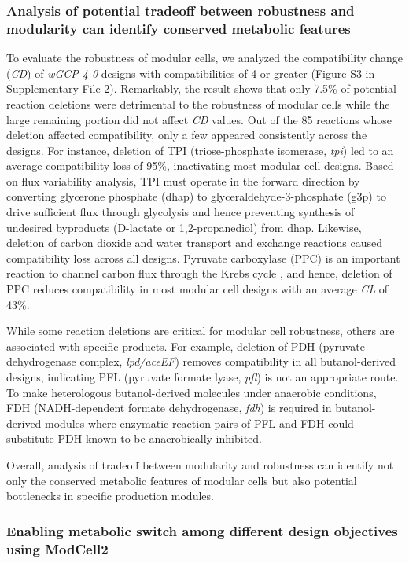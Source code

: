 \subsubsection{Analysis of potential tradeoff between robustness and
modularity can identify conserved metabolic features}
To evaluate the
robustness of modular cells, we analyzed the compatibility change
(\emph{CD}) of \emph{wGCP-4-0} designs with compatibilities of 4 or
greater (Figure S3 in Supplementary File 2). Remarkably, the result
shows that only 7.5\% of potential reaction deletions were detrimental
to the robustness of modular cells while the large remaining portion did
not affect \emph{CD} values. Out of the 85 reactions whose deletion
affected compatibility, only a few appeared consistently across the
designs. For instance, deletion of TPI (triose-phosphate isomerase,
\emph{tpi}) led to an average compatibility loss of 95\%, inactivating
most modular cell designs. Based on flux variability analysis, TPI must
operate in the forward direction by converting glycerone phosphate
(dhap) to glyceraldehyde-3-phosphate (g3p) to drive sufficient flux
through glycolysis and hence preventing synthesis of undesired
byproducts (D-lactate or 1,2-propanediol) from dhap. Likewise, deletion
of carbon dioxide and water transport and exchange reactions caused
compatibility loss across all designs. Pyruvate carboxylase (PPC) is an
important reaction to channel carbon flux through the Krebs cycle
\citep{coomes1985}, and hence, deletion of PPC reduces
compatibility in most modular cell designs with an average \emph{CL} of
43\%.

While some reaction deletions are critical for modular cell robustness, others are associated with specific products.
For example, deletion of PDH (pyruvate dehydrogenase complex, \emph{lpd/aceEF}) removes compatibility in all butanol-derived designs, indicating PFL (pyruvate formate lyase, \emph{pfl}) is not an appropriate route.
To make heterologous butanol-derived molecules under anaerobic conditions, FDH (NADH-dependent formate dehydrogenase, \emph{fdh}) is required in butanol-derived modules where enzymatic reaction pairs of PFL and FDH could substitute PDH known to be anaerobically inhibited.

Overall, analysis of tradeoff between modularity and robustness can identify not only the conserved metabolic features of modular cells but also potential bottlenecks in specific production modules.

\subsubsection{Enabling metabolic switch among different design
objectives using ModCell2}

